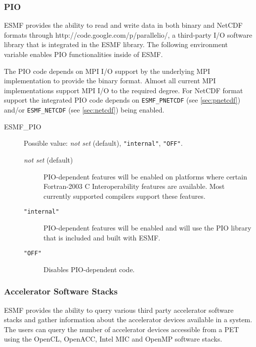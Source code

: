 \subsubsection{PIO}
\label{sec:pio}
ESMF provides the ability to read and write data in both binary and
NetCDF formats through 
{http://code.google.com/p/parallelio/}, a third-party I/O software
library that is integrated in the ESMF library. The following environment
variable enables PIO functionalities inside of ESMF.

The PIO code depends on MPI I/O support by the underlying MPI
implementation to provide the binary format. Almost all current MPI
implementations support MPI I/O to the required degree. For NetCDF format
support the integrated PIO code depends on {\tt ESMF\_PNETCDF}
(see \ref{sec:pnetcdf}) and/or {\tt ESMF\_NETCDF} (see \ref{sec:netcdf})
being enabled.

\begin{description}
\item[ESMF\_PIO] Possible value: {\it not set} (default), {\tt "internal"},
{\tt "OFF"}.

\begin{description}
\item[{\it not set} (default)] PIO-dependent features will be enabled on platforms where
certain Fortran-2003 C Interoperability features are available.  Most currently supported
compilers support these features.

\item[{\tt "internal"}] PIO-dependent features will be enabled and will use the
PIO library that is included and built with ESMF.

\item[{\tt "OFF"}] Disables PIO-dependent code.

\end{description}

\end{description}

\subsubsection{Accelerator Software Stacks}
\label{sec:acc}
ESMF provides the ability to query various third party accelerator software
stacks and gather information about the accelerator devices available in a
system. The users can query the number of accelerator devices accessible
from a PET using the OpenCL, OpenACC, Intel MIC and OpenMP software stacks.

